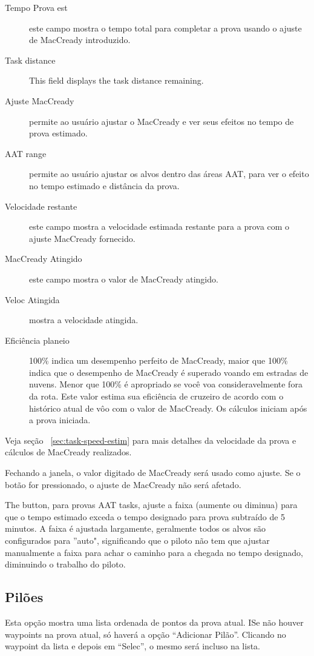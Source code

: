 \begin{description}
\item[Tempo Prova est]  este campo mostra o tempo total para completar a prova usando o ajuste de MacCready introduzido.
\item[Task distance]  This field displays the task distance remaining.
\item[Ajuste MacCready]  permite ao usuário ajustar o MacCready e ver seus efeitos no tempo de prova estimado.
\item[AAT range]  permite ao usuário ajustar os alvos dentro das áreas AAT, para ver o efeito no tempo estimado e distância da prova.
\item[Velocidade restante]  este campo mostra a velocidade estimada restante para a prova com o ajuste MacCready fornecido.
\item[MacCready Atingido]  este campo mostra o valor de MacCready atingido.
\item[Veloc Atingida] mostra a velocidade atingida.
\item[Eficiência planeio]  100\% indica um desempenho perfeito de MacCready, maior que 100\% indica que o desempenho de MacCready é superado voando em estradas de nuvens.  Menor que 100\% é apropriado se você voa consideravelmente fora da rota.  Este valor estima sua eficiência de cruzeiro de acordo com o histórico atual de vôo com o valor de MacCready.    Os cálculos iniciam após a prova iniciada.
\end{description}
Veja seção ~\ref{sec:task-speed-estim} para mais detalhes da velocidade da prova e cálculos de MacCready realizados.

Fechando a janela, o valor digitado de MacCready será usado como ajuste. Se o botão  for pressionado, o ajuste de MacCready não será afetado.

The  button, para provas AAT tasks, ajuste a faixa (aumente ou diminua) para que o tempo estimado exceda o tempo designado para prova subtraído de 5 minutos. A faixa é ajustada largamente, geralmente todos os alvos são configurados para ''auto", significando que o piloto não tem que ajustar manualmente a faixa para achar o caminho para a chegada no tempo designado, diminuindo o trabalho do piloto.
  
\subsection*{Pilões}
Esta opção mostra uma lista ordenada de pontos da prova atual.
ISe não houver waypoints na prova atual, só haverá a opção “Adicionar Pilão”.  Clicando no waypoint da lista e depois em “Selec”, o mesmo será incluso na lista.  

